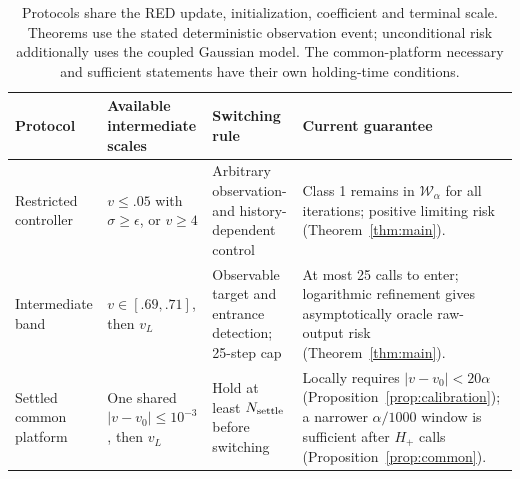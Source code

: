 \begin{table}[t]
\centering\small
\setlength{\tabcolsep}{4pt}
\begin{tabular}{p{}p{}p{}p{}}
\toprule
Protocol & Available intermediate scales & Switching rule & Current guarantee\\
\midrule
Restricted controller & $v\le.05$ with $\sigma\ge\epsilon$, or $v\ge4$ & Arbitrary observation- and history-dependent control & Class 1 remains in $\mathcal W_\alpha$ for all iterations; positive limiting risk (Theorem~\ref{thm:main}).\\[3pt]
Intermediate band & $v\in[.69,.71]$, then $v_L$ & Observable target and entrance detection; 25-step cap & At most 25 calls to enter; logarithmic refinement gives asymptotically oracle raw-output risk (Theorem~\ref{thm:main}).\\[3pt]
Settled common platform & One shared $|v-v_0|\le10^{-3}$, then $v_L$ & Hold at least $N_{\rm settle}$ before switching & Locally requires $|v-v_0|<20\alpha$ (Proposition~\ref{prop:calibration}); a narrower $\alpha/1000$ window is sufficient after $H_+$ calls (Proposition~\ref{prop:common}).\\
\bottomrule
\end{tabular}
\caption{Protocols share the RED update, initialization, coefficient and terminal scale. Theorems use the stated deterministic observation event; unconditional risk additionally uses the coupled Gaussian model. The common-platform necessary and sufficient statements have their own holding-time conditions.}
\label{tab:protocols}
\end{table}
